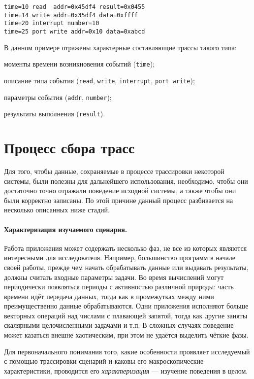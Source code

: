 \begin{lstlisting}
time=10 read  addr=0x45df4 result=0x0455
time=14 write addr=0x35df4 data=0xffff
time=20 interrupt number=10
time=25 port write addr=0x10 data=0xabcd
\end{lstlisting}

В данном примере отражены характерные составляющие трассы такого типа:
\begin{itemize*}
    \item моменты времени возникновения событий (\texttt{time});
    \item описание типа события (\texttt{read}, \texttt{write}, \texttt{interrupt}, \texttt{port write});
    \item параметры события (\texttt{addr}, \texttt{number});
    \item результаты выполнения (\texttt{result}).
\end{itemize*}

\section{Процесс сбора трасс}

Для того, чтобы данные, сохраняемые в процессе трассировки некоторой системы, были полезны для дальнейшего использования, необходимо, чтобы они достаточно точно отражали поведение исходной системы, а также чтобы они были корректно записаны. По этой причине данный процесс разбивается на несколько описанных ниже стадий.

\paragraph{Характеризация изучаемого сценария.} Работа приложения может содержать несколько фаз, не все из которых являются интересными для исследователя. Например, большинство программ в начале своей работы, прежде чем начать обрабатывать данные или выдавать результаты, должны считать входные параметры задачи. Во время вычислений могут периодически появляться периоды с активностью различной природы: часть времени идёт передача данных, тогда как в промежутках между ними преимущественно данные обрабатываются. Одни приложения исполняют больше векторных операций над числами с плавающей запятой, тогда как другие заняты скалярными целочисленными задачами и т.п. В сложных случаях поведение может казаться внешне хаотическим, при этом не удаётся выделить чёткие фазы.

Для первоначального понимания того, какие особенности проявляет исследуемый с помощью трассировки сценарий и каковы его макроскопические характеристики, проводится его \textit{характеризация} --- изучение поведения в целом.

